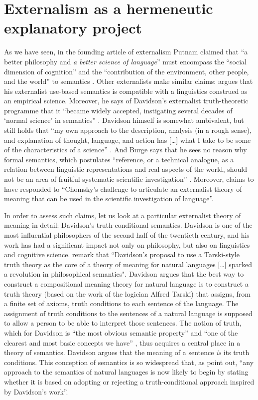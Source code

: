 \section{Externalism as a hermeneutic explanatory project}
As we have seen, in the founding article of externalism Putnam claimed that “a better philosophy and \textit{a better science of language}” must encompass the “social dimension of cognition” and the “contribution of the environment, other people, and the world” to semantics \citep[193, emphasis mine]{Putnam1975}. Other externalists make similar claims: \citet{Horwich1998,Horwich2005} argues that his externalist use-based semantics is compatible with a linguistics construed as an empirical science. Moreover, he says of Davidson’s externalist truth-theoretic programme that it “became widely accepted, instigating several decades of ‘normal science’ in semantics” \citep[371]{Horwich2001}. Davidson himself is somewhat ambivalent, but still holds that “my own approach to the description, analysis (in a rough sense), and explanation of thought, language, and action has […] what I take to be some of the characteristics of a science” \citep[123]{Davidson1995}. And Burge says that he sees no reason why formal semantics, which postulates “reference, or a technical analogue, as a relation between linguistic representations and real aspects of the world, should not be an area of fruitful systematic scientific investigation” \citep[465]{Burge2003}. Moreover, \citet[607]{Lassiter2008} claims to have responded to “Chomsky’s challenge to articulate an externalist theory of meaning that can be used in the scientific investigation of language”.
	
In order to assess such claims, let us look at a particular externalist theory of meaning in detail: Davidson’s truth-conditional semantics. Davidson is one of the most influential philosophers of the second half of the twentieth century, and his work has had a significant impact not only on philosophy, but also on linguistics and cognitive science. \citet[viii]{LeporeLudwig2005} remark that “Davidson’s proposal to use a Tarski-style truth theory as the core of a theory of meaning for natural languages […] sparked a revolution in philosophical semantics". Davidson argues that the best way to construct a compositional meaning theory for natural language is to construct a truth theory (based on the work of the logician Alfred Tarski) that assigns, from a finite set of axioms, truth conditions to each sentence of the language. The assignment of truth conditions to the sentences of a natural language is supposed to allow a person to be able to interpret those sentences. The notion of truth, which for Davidson is “the most obvious semantic property” and “one of the clearest and most basic concepts we have” \citep[2, 55]{Davidson2005}, thus acquires a central place in a theory of semantics. Davidson argues that the meaning of a sentence \textit{is} its truth conditions. This conception of semantics is so widespread that, as \citet[310]{LeporeLudwig2004} point out, “any approach to the semantics of natural languages is now likely to begin by stating whether it is based on adopting or rejecting a truth-conditional approach inspired by Davidson’s work”. 

